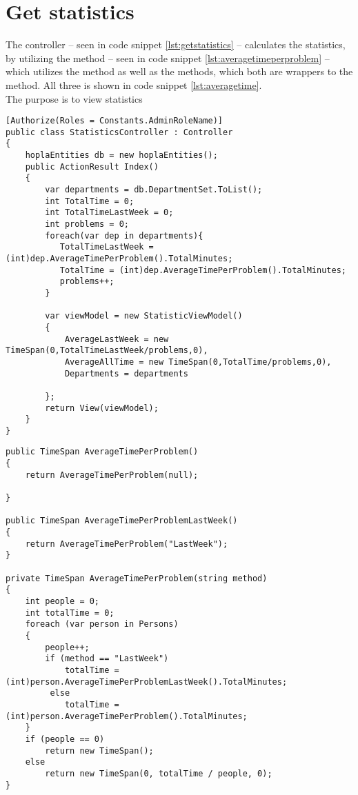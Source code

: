 \section{Get statistics}
\label{sec:getstatistics}

The  controller -- seen in code snippet \ref{lst:getstatistics} -- calculates the statistics, by utilizing the  method -- seen in code snippet \ref{lst:averagetimeperproblem} --  which utilizes the  method as well as the  methods, which both are wrappers to the  method. All three is shown in code snippet \ref{lst:averagetime}.\\
The purpose is to view statistics 

\begin{lstlisting}[style=sourceCode, caption=\myCaption{The StatisticsController controller}, label=lst:getstatistics]
[Authorize(Roles = Constants.AdminRoleName)]
public class StatisticsController : Controller
{
    hoplaEntities db = new hoplaEntities();
    public ActionResult Index()
    {
        var departments = db.DepartmentSet.ToList();
        int TotalTime = 0;
        int TotalTimeLastWeek = 0;
        int problems = 0;
        foreach(var dep in departments){
           TotalTimeLastWeek = (int)dep.AverageTimePerProblem().TotalMinutes;
           TotalTime = (int)dep.AverageTimePerProblem().TotalMinutes;
           problems++;
        }

        var viewModel = new StatisticViewModel()
        {
            AverageLastWeek = new TimeSpan(0,TotalTimeLastWeek/problems,0),
            AverageAllTime = new TimeSpan(0,TotalTime/problems,0),
            Departments = departments
            
        };
        return View(viewModel);
    }
}
\end{lstlisting}


\begin{lstlisting}[style=sourceCode, caption=\myCaption{The AverageTimePerProblem(string method) method -- which is found in the \cl{Department} class -- together with its wrappers.}, label=lst:averagetimeperproblem]
public TimeSpan AverageTimePerProblem()
{
    return AverageTimePerProblem(null);

}

public TimeSpan AverageTimePerProblemLastWeek()
{
    return AverageTimePerProblem("LastWeek");
}

private TimeSpan AverageTimePerProblem(string method)
{
    int people = 0;
    int totalTime = 0;
    foreach (var person in Persons)
    {
        people++;
        if (method == "LastWeek")
            totalTime = (int)person.AverageTimePerProblemLastWeek().TotalMinutes;
         else 
            totalTime = (int)person.AverageTimePerProblem().TotalMinutes;
    }
    if (people == 0)
        return new TimeSpan();
    else
        return new TimeSpan(0, totalTime / people, 0);
}
\end{lstlisting}

